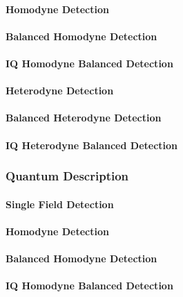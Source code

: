 \paragraph{Homodyne Detection}

\paragraph{Balanced Homodyne Detection}

\paragraph{IQ Homodyne Balanced Detection}

\paragraph{Heterodyne Detection}

\paragraph{Balanced Heterodyne Detection}

\paragraph{IQ Heterodyne Balanced Detection}

\subsubsection{Quantum Description}

\paragraph{Single Field Detection}

\paragraph{Homodyne Detection}

\paragraph{Balanced Homodyne Detection}

\paragraph{IQ Homodyne Balanced Detection}

